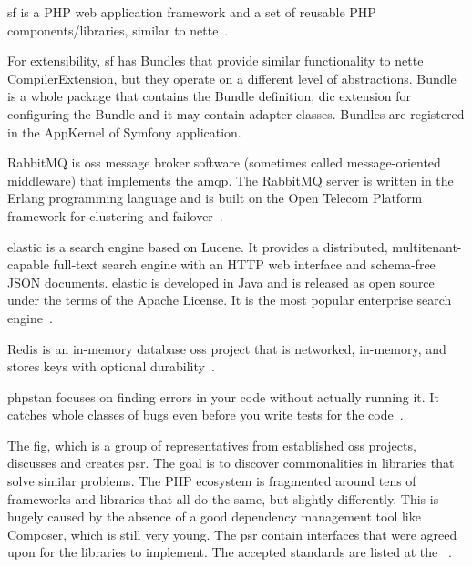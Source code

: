 \label{sec:theory:symfony}

\gls{sf} is a PHP web application framework and a set of reusable PHP components/libraries, similar to \gls{nette}~\cite{wiki:symfony}.

For extensibility, \gls{sf} has Bundles that provide similar functionality to \gls{nette} CompilerExtension, but they operate on a different level of abstractions. Bundle is a whole package that contains the Bundle definition, \gls{dic} extension for configuring the Bundle and it may contain adapter classes. Bundles are registered in the AppKernel of Symfony application.

 \label{sec:theory:rabbitmq}

RabbitMQ is \gls{oss} message broker software (sometimes called message-oriented middleware) that implements the \gls{amqp}. The RabbitMQ server is written in the Erlang programming language and is built on the Open Telecom Platform framework for clustering and failover~\cite{wiki:rabbitmq}.

 \label{sec:theory:elasticsearch}

\gls{elastic} is a search engine based on Lucene. It provides a distributed, multitenant-capable full-text search engine with an HTTP web interface and schema-free JSON documents. \gls{elastic} is developed in Java and is released as open source under the terms of the Apache License. It is the most popular enterprise search engine~\cite{wiki:elasticsearch}.

 \label{sec:theory:redis}

Redis is an in-memory database \gls{oss} project that is networked, in-memory, and stores keys with optional durability~\cite{wiki:redis}.

 \label{sec:theory:phpstan}

\gls{phpstan} focuses on finding errors in your code without actually running it. It catches whole classes of bugs even before you write tests for the code~\cite{github:phpstan}.

 \label{sec:theory:psr}

The \gls{fig}, which is a group of representatives from established \gls{oss} projects, discusses and creates \gls{psr}. The goal is to discover commonalities in libraries that solve similar problems. The PHP ecosystem is fragmented around tens of frameworks and libraries that all do the same, but slightly differently. This is hugely caused by the absence of a good dependency management tool like Composer, which is still very young. The \gls{psr} contain interfaces that were agreed upon for the libraries to implement. The accepted standards are listed at the ~\cite{fig:psr}.


